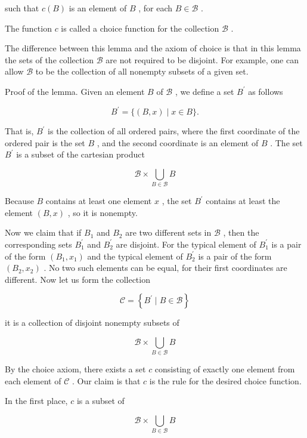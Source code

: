 \documentclass[10pt]{article}
\begin{document}
such that \(c\left( B\right)\) is an element of \(B\) , for each \(B \in  \mathcal{B}\) .

The function \(c\) is called a choice function for the collection \(\mathcal{B}\) .

The difference between this lemma and the axiom of choice is that in this lemma the sets of the collection \(\mathcal{B}\) are not required to be disjoint. For example, one can allow \(\mathcal{B}\) to be the collection of all nonempty subsets of a given set.

Proof of the lemma. Given an element \(B\) of \(\mathcal{B}\) , we define a set \({B}^{\prime }\) as follows

\[
{B}^{\prime } = \{ \left( {B,x}\right)  \mid  x \in  B\} .
\]

That is, \({B}^{\prime }\) is the collection of all ordered pairs, where the first coordinate of the ordered pair is the set \(B\) , and the second coordinate is an element of \(B\) . The set \({B}^{\prime }\) is a subset of the cartesian product

\[
\mathcal{B} \times  \mathop{\bigcup }\limits_{{B \in  \mathcal{B}}}B
\]

Because \(B\) contains at least one element \(x\) , the set \({B}^{\prime }\) contains at least the element \(\left( {B,x}\right)\) , so it is nonempty.

Now we claim that if \({B}_{1}\) and \({B}_{2}\) are two different sets in \(\mathcal{B}\) , then the corresponding sets \({B}_{1}^{\prime }\) and \({B}_{2}^{\prime }\) are disjoint. For the typical element of \({B}_{1}^{\prime }\) is a pair of the form \(\left( {{B}_{1},{x}_{1}}\right)\) and the typical element of \({B}_{2}^{\prime }\) is a pair of the form \(\left( {{B}_{2},{x}_{2}}\right)\) . No two such elements can be equal, for their first coordinates are different. Now let us form the collection

\[
\mathcal{C} = \left\{  {{B}^{\prime } \mid  B \in  \mathcal{B}}\right\}
\]

it is a collection of disjoint nonempty subsets of

\[
\mathcal{B} \times  \mathop{\bigcup }\limits_{{B \in  \mathcal{B}}}B
\]

By the choice axiom, there exists a set \(c\) consisting of exactly one element from each element of \(\mathcal{C}\) . Our claim is that \(c\) is the rule for the desired choice function.

In the first place, \(c\) is a subset of

\[
\mathcal{B} \times  \mathop{\bigcup }\limits_{{B \in  \mathcal{B}}}B
\]
\end{document}
